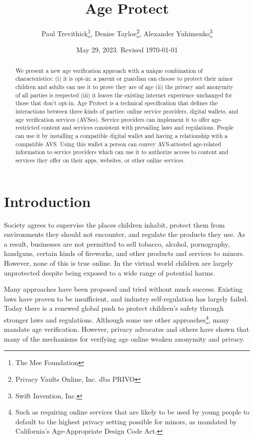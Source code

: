 \documentclass[11pt, oneside]{article}   	%
\title{Age Protect}
\author{Paul Trevithick\footnote{The Mee Foundation}, Denise Tayloe\footnote{Privacy Vaults Online, Inc. dba PRIVO}, Alexander Yuhimenko\footnote{Swift Invention, Inc.}}
\date{May 29, 2023. Revised \today}
\begin{document}
\maketitle
\begin{abstract}
	We present a new age verification approach with a unique combination of characteristics: (i) it is opt-in: a parent or guardian can choose to protect their minor children and adults can use it to prove they are of age (ii) the privacy and anonymity of all parties is respected (iii) it leaves the existing internet experience unchanged for those that don't opt-in. Age Protect is a technical specification that defines the interactions between three kinds of parties: online service providers, digital wallets, and age verification services (AVSes). Service providers can implement it to offer age-restricted content and services consistent with prevailing laws and regulations. People can use it by installing a compatible digital wallet and having a relationship with a compatible AVS. Using this wallet a person can convey AVS-attested age-related information to service providers which can use it to authorize access to content and services they offer on their apps, websites, or other online services. 
\end{abstract}

\section{Introduction}

Society agrees to supervise the places children inhabit, protect them from environments they should not encounter, and regulate the products they use. As a result, businesses are not permitted to sell tobacco, alcohol, pornography, handguns, certain kinds of fireworks, and other products and services to minors. However, none of this is true online. In the virtual world children are largely unprotected despite being exposed to a wide range of potential harms. 

Many approaches have been proposed and tried without much success. Existing laws have proven to be insufficient, and industry self-regulation has largely failed. Today there is a renewed global push to protect children's safety through stronger laws and regulations. Although some use other approaches\footnote{Such as requiring online services that are likely to be used by young people to default to the highest privacy setting possible for minors, as mandated by California's Age-Appropriate Design Code Act.}, many mandate age verification.\cite{Griswold2023}\cite{Jackson2023} However, privacy advocates and others have shown that many of the mechanisms for verifying age online weaken anonymity and privacy.\cite{Roth2023} 
\end{document}
